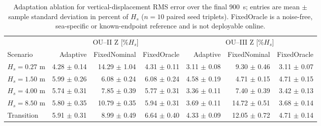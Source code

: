 \begin{table}[t]
  \centering
  \caption{Adaptation ablation for vertical-displacement RMS error over the final \SI{900}{s}; entries are mean $\pm$ sample standard deviation in percent of $H_s$ ($n=10$ paired seed triplets). FixedOracle is a noise-free, sea-specific or known-endpoint reference and is not deployable online.}
  \label{tab:ou_mc_adaptation}
  \footnotesize
  \setlength{\tabcolsep}{3.6pt}
  \begin{tabular}{@{}lrrrrrr@{}}
    \toprule
    & \multicolumn{3}{c}{OU--II Z [\%$H_s$]} & \multicolumn{3}{c}{OU--III Z [\%$H_s$]} \\
    \cmidrule(lr){2-4}\cmidrule(lr){5-7}
    Scenario & Adaptive & FixedNominal & FixedOracle & Adaptive & FixedNominal & FixedOracle \\
    \midrule
    $H_s=0.27$ m & 4.28 $\pm$ 0.14 & 14.29 $\pm$ 1.04 & 4.31 $\pm$ 0.11 & 3.11 $\pm$ 0.08 & 9.30 $\pm$ 0.46 & 3.11 $\pm$ 0.07 \\
    $H_s=1.50$ m & 5.99 $\pm$ 0.26 & 6.08 $\pm$ 0.24 & 6.08 $\pm$ 0.24 & 4.58 $\pm$ 0.19 & 4.71 $\pm$ 0.15 & 4.71 $\pm$ 0.15 \\
    $H_s=4.00$ m & 5.74 $\pm$ 0.31 & 7.85 $\pm$ 0.39 & 5.77 $\pm$ 0.31 & 3.36 $\pm$ 0.11 & 7.40 $\pm$ 0.39 & 3.42 $\pm$ 0.13 \\
    $H_s=8.50$ m & 5.80 $\pm$ 0.35 & 10.79 $\pm$ 0.35 & 5.94 $\pm$ 0.31 & 3.69 $\pm$ 0.11 & 14.72 $\pm$ 0.51 & 3.68 $\pm$ 0.14 \\
    Transition & 5.91 $\pm$ 0.31 & 8.99 $\pm$ 0.49 & 6.64 $\pm$ 0.40 & 4.33 $\pm$ 0.09 & 12.05 $\pm$ 0.72 & 4.71 $\pm$ 0.14 \\
    \bottomrule
  \end{tabular}
\end{table}

